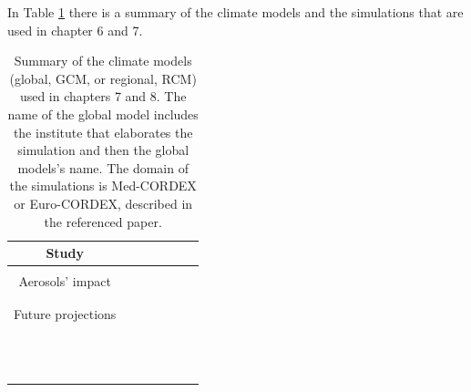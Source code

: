In Table \ref{climatemodels} there is a summary of the climate models and the simulations that are used in chapter 6 and 7.

\begin{table}[h!]
  \begin{tabular}{c|>{\raggedrigth}m{1cm}>{\raggedright}m{2cm}>{\raggedright}m{2cm}>{\raggedright}m{2cm}>{\raggedright}m{1.5cm}>{\raggedright}m{3cm}}
    \toprule 
    Study & \centering{Climate Model}  & &  \tabularnewline
    \midrule                                                         
    & \centering{GCM} & \centering{RCM} & \centering{Domain} & \centering{Resolution RCM} &\centering{Simulation} \tabularnewline                                            
    \midrule
     Aerosols' impact & \centering{CNRM-CM5} & \centering{CNRM-ALADIN53} & \centering{Med-CORDEX} & \centering{0.44º} & \centering{AER}\midrule\\
    \centering{NO-AER}\midrule\\
    \centering{TREND}
    \tabularnewline
   \midrule
    Future projections & \centering{CNRM-CM5} & \centering{ALADIN53}\midrule\\
    \centering{RCA4}\midrule\\
    \centering{CCLM4}\midrule & \centering{Euro-CORDEX} & \centering{0.11º} & \centering{HIST/RCP8.5}\\
    \centering{HIST/RCP8.5}\\
    \centering{HIST/RCP8.5}
    \tabularnewline
          & \centering{EC-EARTH} & \centering{RACMO}\midrule\\
    \centering{RCA4}\midrule\\
    \centering{CCLM4}\midrule & \centering{Euro-CORDEX} & \centering{0.11º} & \centering{HIST/RCP8.5}\\
    \centering{HIST/RCP8.5}\\
    \centering{HIST/RCP8.5}
    \tabularnewline
          & \centering{CNRM-CM5} & \centering{ALADIN-RCSM4}\midrule\\
    \centering{PROTHEUS}\midrule & \centering{Med-CORDEX} & \centering{0.44º} & \centering{HIST/RCP4.5}\\
    \centering{HIST/RCP4.5}
    \tabularnewline
 \bottomrule
  \end{tabular}
  \caption[Summary of the climate models (global, GCM, or regional, RCM) used in chapters 7 and 8]{Summary of the climate models (global, GCM, or regional, RCM) used in chapters 7 and 8. The name of the global model includes the institute that elaborates the simulation and then the global models's name. The domain of the simulations is Med-CORDEX or Euro-CORDEX, described in the referenced paper.}
  \label{climatemodels}
\end{table}
 

